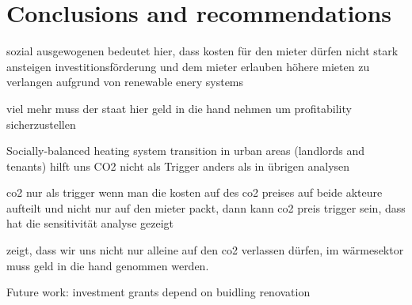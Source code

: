 \section{Conclusions and recommendations}\label{conclusions}


sozial ausgewogenen bedeutet hier, dass kosten für den mieter dürfen nicht stark ansteigen 
investitionsförderung und dem mieter erlauben höhere mieten zu verlangen aufgrund von renewable enery systems


viel mehr muss der staat hier geld in die hand nehmen um profitability sicherzustellen 

Socially-balanced heating system transition in urban areas (landlords and tenants) hilft uns CO2 nicht als Trigger anders als in übrigen analysen

co2 nur als trigger wenn man die kosten auf des co2 preises auf beide akteure aufteilt und nicht nur auf den mieter packt, dann kann co2 preis trigger sein, dass hat die sensitivität analyse gezeigt

zeigt, dass wir uns nicht nur alleine auf den co2 verlassen dürfen, im wärmesektor muss geld in die hand genommen werden. 


Future work: investment grants depend on buidling renovation